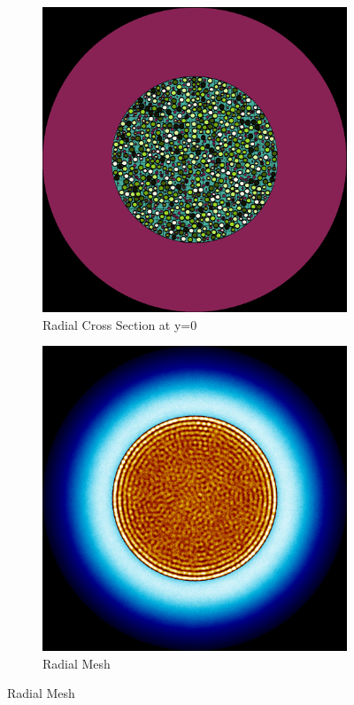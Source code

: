 \begin{figure}[H]
\centering

\begin{subfigure}{0.45\textwidth}
  \includegraphics[width=0.95\linewidth]{figures/5601234/5601234-r}
  \caption{Radial Cross Section at y=0}
  \label{fig:5601234-r}
\end{subfigure}%
%
\begin{subfigure}{0.45\textwidth}
  \includegraphics[width=0.95\linewidth]{figures/5601234/5601234-rm}
  \caption{Radial Mesh}
  \label{fig:5601234-rm}
\end{subfigure}


\end{figure}
